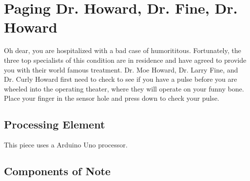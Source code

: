 %
%
%
%
% 
%
%
%
%
%
% 
%

\section{Paging Dr. Howard, Dr. Fine, Dr. Howard}

Oh dear, you are hospitalized with a bad case of humorititous. Fortunately,
the three top specialists of this condition are in residence and have agreed
to provide you with their world famous treatment. Dr. Moe Howard, Dr. Larry
Fine, and Dr. Curly Howard first need to check to see if you have a pulse
before you are wheeled into the operating theater, where they will operate on
your funny bone. Place your finger in the sensor hole and press down to check
your pulse.

\subsection*{Processing Element}

This piece uses a Arduino Uno processor.

\subsection*{Components of Note}

